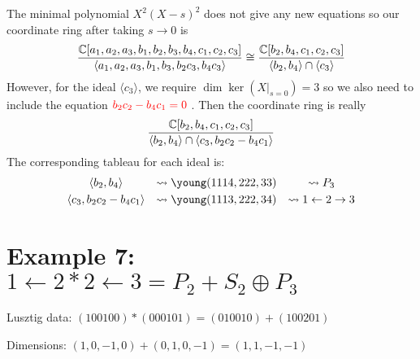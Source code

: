 \documentclass{article}
\begin{document}
The minimal polynomial $X^2(X-s)^2$ does not give any new equations so our coordinate ring after taking $s \rightarrow 0$ is
$$\frac{\mathbb C[a_1,a_2,a_3,b_1,b_2,b_3,b_4,c_1,c_2,c_3]}{\langle a_1,a_2,a_3,b_1,b_3,b_2c_3,b_4c_3 \rangle} \cong \frac{\mathbb C[b_2,b_4,c_1,c_2,c_3]}{\langle b_2,b_4 \rangle \cap \langle c_3 \rangle}$$
However, for the ideal $\langle c_3 \rangle$, we require $\dim \ker (X|_{s = 0}) = 3$ so we also need to include the equation ${\color{red} b_2c_2 - b_4c_1 = 0}$ . Then the coordinate ring is really
$$\frac{\mathbb C[b_2,b_4,c_1,c_2,c_3]}{\langle b_2,b_4 \rangle \cap \langle c_3,b_2c_2-b_4c_1 \rangle}$$
The corresponding tableau for each ideal is:
\[\begin{array}{ccc}\vspace{1mm}
    \langle b_2,b_4 \rangle &\leadsto \young(1114,222,33) &\leadsto P_3 \\ 
    \langle c_3,b_2c_2-b_4c_1 \rangle &\leadsto \young(1113,222,34) &\leadsto 1 \leftarrow 2 \rightarrow 3
\end{array}
\]

\section{Example 7: $1 \leftarrow 2 * 2 \leftarrow 3 = P_2 + S_2 \oplus P_3$}
Lusztig data: $(100100) * (000101) = (010010) + (100201)$

Dimensions: $(1,0,-1,0) + (0,1,0,-1) = (1,1,-1,-1)$
\end{document}
